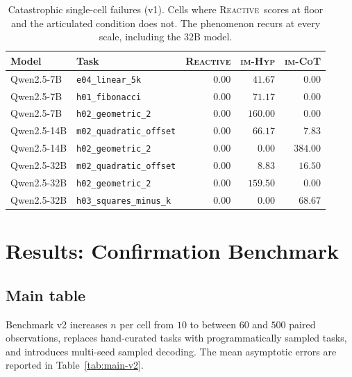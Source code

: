 \documentclass[11pt]{article}
\newcommand{\imhyp}{\textsc{im-Hyp}}
\newcommand{\imcot}{\textsc{im-CoT}}
\newcommand{\reactive}{\textsc{Reactive}}
\begin{document}
\begin{table}[t]
\centering
\caption{Catastrophic single-cell failures (v1).  Cells where
\reactive\ scores at floor and the articulated condition does not.
The phenomenon recurs at every scale, including the $32$B model.}
\label{tab:catas-v1}
\small
\begin{tabular}{ll rrr}
\toprule
Model & Task & \reactive & \imhyp & \imcot \\
\midrule
Qwen2.5-7B  & \texttt{e04\_linear\_5k}        & $0.00$ & $41.67$  & $0.00$  \\
Qwen2.5-7B  & \texttt{h01\_fibonacci}         & $0.00$ & $71.17$  & $0.00$  \\
Qwen2.5-7B  & \texttt{h02\_geometric\_2}      & $0.00$ & $160.00$ & $0.00$  \\
Qwen2.5-14B & \texttt{m02\_quadratic\_offset} & $0.00$ & $66.17$  & $7.83$  \\
Qwen2.5-14B & \texttt{h02\_geometric\_2}      & $0.00$ & $0.00$   & $384.00$ \\
Qwen2.5-32B & \texttt{m02\_quadratic\_offset} & $0.00$ & $8.83$   & $16.50$ \\
Qwen2.5-32B & \texttt{h02\_geometric\_2}      & $0.00$ & $159.50$ & $0.00$  \\
Qwen2.5-32B & \texttt{h03\_squares\_minus\_k} & $0.00$ & $0.00$   & $68.67$ \\
\bottomrule
\end{tabular}
\end{table}

\section{Results: Confirmation Benchmark}
\label{sec:results-v2}

\subsection{Main table}

Benchmark v2 increases $n$ per cell from $10$ to between $60$ and
$500$ paired observations, replaces hand-curated tasks with
programmatically sampled tasks, and introduces multi-seed sampled
decoding.  The mean asymptotic errors are reported in
Table~\ref{tab:main-v2}.
\end{document}
